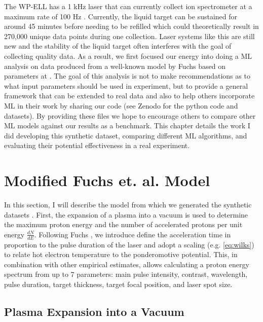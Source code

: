 The \gls{WP-ELL} has a 1 kHz laser that can currently collect ion spectrometer at a maximum rate of 100 Hz \cite{George_2019_HPLSE}. Currently, the liquid target can be sustained for around 45 minutes before needing to be refilled which could theoretically result in 270,000 unique data points during one collection. Laser systems like this are still new and the stability of the liquid target often interferes with the goal of collecting quality data. As a result, we first focused our energy into doing a \gls{ML} analysis on data produced from a well-known model by Fuchs \cite{Fuchs_2005_Nat} based on parameters at . The goal of this analysis is not to make recommendations as to what input parameters should be used in experiment, but to provide a general framework that can be extended to real data and also to help others incorporate \gls{ML} in their work by sharing our code (see Zenodo \cite{Desai_2024_Zenodo} for the python code and datasets). By providing these files we hope to encourage others to compare other ML models against our results as a benchmark. This chapter details the work I did developing this synthetic dataset, comparing different \gls{ML} algorithms, and evaluating their potential effectiveness in a real experiment. 

\section{Modified Fuchs et. al. Model}

In this section, I will describe the model from which we generated the synthetic datasets \cite{Desai_2024_CPP,Desai_2024_arX}. First, the expansion of a plasma into a vacuum \cite{Mora_2003_PRL} is used to determine the maximum proton energy and the number of accelerated protons per unit energy $\frac{dN}{dE}$. Following Fuchs \cite{Fuchs_2005_Nat}, we introduce define the acceleration time in proportion to the pulse duration of the laser and adopt a scaling (e.g. \cref{eq:wilks}) to relate hot electron temperature to the ponderomotive potential. This, in combination with other empirical estimates, allows calculating a proton energy spectrum from up to 7 parameters: main pulse intensity, contrast, wavelength, pulse duration, target thickness, target focal position, and laser spot size.

\subsection{Plasma Expansion into a Vacuum}

